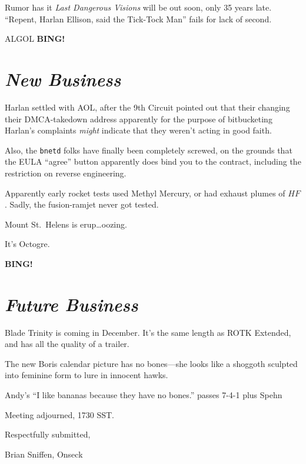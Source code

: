 \documentclass[10pt]{article}
\newcommand{\bing}{{\bf BING!} }
\newcommand{\goto}[1]{\bing \vskip 12pt \section*{{\em{#1}}}}
\newcommand{\ps}{ plus Spehn\xspace}
\begin{document}
Rumor has it \emph{Last Dangerous Visions} will be out soon, only 35
years late.  ``Repent, Harlan Ellison, said the Tick-Tock Man'' fails
for lack of second.

ALGOL
\goto{New Business}
Harlan settled with AOL, after the 9th Circuit pointed out that their
changing their DMCA-takedown address apparently for the purpose of
bitbucketing Harlan's complaints \emph{might} indicate that they
weren't acting in good faith.

Also, the \texttt{bnetd} folks have finally been completely screwed,
on the grounds that the EULA ``agree'' button apparently does bind you
to the contract, including the restriction on reverse engineering.

Apparently early rocket tests used Methyl Mercury, or had exhaust
plumes of $HF$.  Sadly, the fusion-ramjet never got tested.

Mount St.~Helens is erup\dots oozing.

It's Octogre.

\goto{Future Business}

Blade Trinity is coming in December.  It's the same length as ROTK
Extended, and has all the quality of a trailer.

The new Boris calendar picture has no bones---she looks like a
shoggoth sculpted into feminine form to lure in innocent hawks.

Andy's ``I like bananas because they have no bones.''  passes 7-4-1\ps

\vspace{12pt}

\noindent
Meeting adjourned, 1730 SST.

\vspace{18pt}

\centerline{Respectfully submitted,}
\centerline{Brian Sniffen, Onseck}
\end{document}
